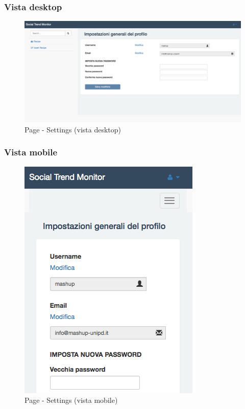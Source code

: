 		\subsubsection{Vista desktop} %
		\begin{figure}[htbp]
			\centering
			\centerline{\includegraphics[scale=0.4]{./images/mockup/settings_vd.pdf}}
			\caption{Page - Settings (vista desktop)}
		\end{figure}

		\subsubsection{Vista mobile} %
		\begin{figure}[htbp]
			\centering
			\centerline{\includegraphics[scale=0.5]{./images/mockup/settings_vm.png}}
			\caption{Page - Settings (vista mobile)}
		\end{figure}

